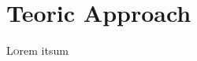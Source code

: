 \chapter{Teoric Approach}
\label{ch:TeoricApproach}


\lettrine[lraise=-0.1, lines=2, loversize=0.2]{L}{o}rem itsum
